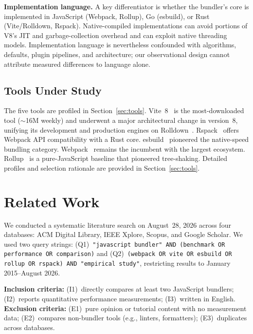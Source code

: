\documentclass[preprint,12pt]{elsarticle}
\begin{document}
\textbf{Implementation language.}
A key differentiator is whether the bundler's core is implemented in JavaScript (Webpack, Rollup), Go (esbuild), or Rust (Vite/Rolldown, Rspack).
Native-compiled implementations can avoid portions of V8's JIT and garbage-collection overhead and can exploit native threading models.
Implementation language is nevertheless confounded with algorithms, defaults, plugin pipelines, and architecture; our observational design cannot attribute measured differences to language alone.

\subsection{Tools Under Study}

The five tools are profiled in Section~\ref{sec:tools}.
Vite~8~\cite{vite2026} is the most-downloaded tool ($\sim$16M weekly) and underwent a major architectural change in version~8, unifying its development and production engines on Rolldown~\cite{rolldown2026}.
Rspack~\cite{rspack2026} offers Webpack API compatibility with a Rust core.
esbuild~\cite{esbuild2026} pioneered the native-speed bundling category.
Webpack~\cite{webpack2026} remains the incumbent with the largest ecosystem.
Rollup~\cite{rollup2026} is a pure-JavaScript baseline that pioneered tree-shaking.
Detailed profiles and selection rationale are provided in Section~\ref{sec:tools}.

\section{Related Work}\label{sec:related}

We conducted a systematic literature search on August~28, 2026 across four databases: ACM Digital Library, IEEE Xplore, Scopus, and Google Scholar.
We used two query strings: (Q1)~\texttt{"javascript bundler" AND (benchmark OR performance OR comparison)} and (Q2)~\texttt{(webpack OR vite OR esbuild OR rollup OR rspack) AND "empirical study"}, restricting results to January 2015--August 2026.

\textbf{Inclusion criteria:} (I1)~directly compares at least two JavaScript bundlers; (I2)~reports quantitative performance measurements; (I3)~written in English.
\textbf{Exclusion criteria:} (E1)~pure opinion or tutorial content with no measurement data; (E2)~compares non-bundler tools (e.g., linters, formatters); (E3)~duplicates across databases.
\end{document}
